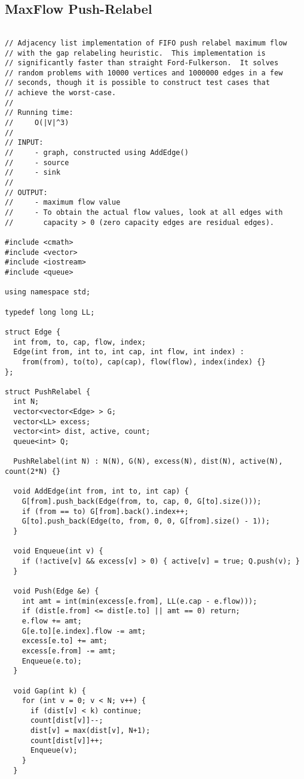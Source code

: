 \subsection{MaxFlow Push-Relabel}

\begin{lstlisting}

// Adjacency list implementation of FIFO push relabel maximum flow
// with the gap relabeling heuristic.  This implementation is
// significantly faster than straight Ford-Fulkerson.  It solves
// random problems with 10000 vertices and 1000000 edges in a few
// seconds, though it is possible to construct test cases that
// achieve the worst-case.
//
// Running time:
//     O(|V|^3)
//
// INPUT: 
//     - graph, constructed using AddEdge()
//     - source
//     - sink
//
// OUTPUT:
//     - maximum flow value
//     - To obtain the actual flow values, look at all edges with
//       capacity > 0 (zero capacity edges are residual edges).

#include <cmath>
#include <vector>
#include <iostream>
#include <queue>

using namespace std;

typedef long long LL;

struct Edge {
  int from, to, cap, flow, index;
  Edge(int from, int to, int cap, int flow, int index) :
    from(from), to(to), cap(cap), flow(flow), index(index) {}
};

struct PushRelabel {
  int N;
  vector<vector<Edge> > G;
  vector<LL> excess;
  vector<int> dist, active, count;
  queue<int> Q;

  PushRelabel(int N) : N(N), G(N), excess(N), dist(N), active(N), count(2*N) {}

  void AddEdge(int from, int to, int cap) {
    G[from].push_back(Edge(from, to, cap, 0, G[to].size()));
    if (from == to) G[from].back().index++;
    G[to].push_back(Edge(to, from, 0, 0, G[from].size() - 1));
  }

  void Enqueue(int v) { 
    if (!active[v] && excess[v] > 0) { active[v] = true; Q.push(v); } 
  }

  void Push(Edge &e) {
    int amt = int(min(excess[e.from], LL(e.cap - e.flow)));
    if (dist[e.from] <= dist[e.to] || amt == 0) return;
    e.flow += amt;
    G[e.to][e.index].flow -= amt;
    excess[e.to] += amt;    
    excess[e.from] -= amt;
    Enqueue(e.to);
  }
  
  void Gap(int k) {
    for (int v = 0; v < N; v++) {
      if (dist[v] < k) continue;
      count[dist[v]]--;
      dist[v] = max(dist[v], N+1);
      count[dist[v]]++;
      Enqueue(v);
    }
  }


\end{lstlisting}
